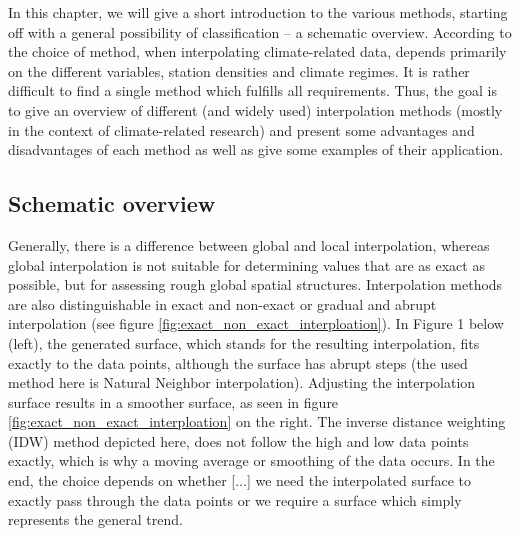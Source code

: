 In this chapter, we will give a short introduction to the various methods, starting off with a general possibility of classification – a schematic overview. According to \citeauthor{hofstra_comparison_2008} the choice of method, when interpolating climate-related data, depends primarily on the different variables, station densities and climate regimes. It is rather difficult to find a single method which fulfills all requirements. Thus, the goal is to give an overview of different (and widely used) interpolation methods (mostly in the context of climate-related research) and present some advantages and disadvantages of each method as well as give some examples of their application.

\subsection{Schematic overview}

Generally, there is a difference between global and local interpolation, whereas global interpolation is not suitable for determining values that are as exact as possible, but for assessing rough global spatial structures. \cite{gitta_raumliche_2016}
Interpolation methods are also distinguishable in exact and non-exact or gradual and abrupt interpolation (see figure \ref{fig:exact_non_exact_interploation}). In Figure 1 below (left), the generated surface, which stands for the resulting interpolation, fits exactly to the data points, although the surface has abrupt  \ldq{}steps\rdq{} (the used method here is Natural Neighbor interpolation). Adjusting the interpolation surface results in a smoother surface, as seen in figure \ref{fig:exact_non_exact_interploation} on the right.
The inverse distance weighting (IDW) method depicted here, does not follow the high and low data points exactly, which is why a \ldq{}moving average\rdq{} or \ldq{}smoothing\rdq{} of the data occurs. In the end, the choice depends on whether  \ldq{}[...] we need the interpolated surface to exactly pass through the data points or we require a surface which simply represents the general trend\rdq{}. \cite{wyatt_interpolation_nodate}



